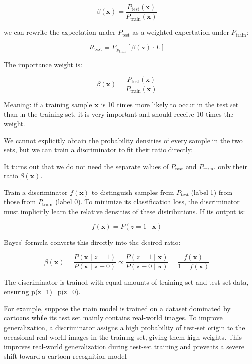 \[
\beta(\mathbf{x})=\frac{P_{\mathrm{test}}(\mathbf{x})}{P_{\mathrm{train}}(\mathbf{x})}
\]

we can rewrite the expectation under \(P_{\mathrm{test}}\) as a weighted expectation under \(P_{\mathrm{train}}\):

\[
R_{\mathrm{test}}=E_{p_{\mathrm{train}}}[\beta(\mathbf{x})\cdot L]
\]

The importance weight is:

\[
\beta(\mathbf{x})=\frac{P_{\mathrm{test}}(\mathbf{x})}{P_{\mathrm{train}}(\mathbf{x})}
\]

Meaning: if a training sample \(\mathbf{x}\) is 10 times more likely to occur in the test set than in the training set, it is very important and should receive 10 times the weight.

We cannot explicitly obtain the probability densities of every sample in the two sets, but we can train a discriminator to fit their ratio directly:

It turns out that we do not need the separate values of \(P_{\mathrm{test}}\) and \(P_{\mathrm{train}}\), only their ratio \(\beta(\mathbf{x})\).

Train a discriminator \(f(\mathbf{x})\) to distinguish samples from \(P_{\mathrm{test}}\) (label 1) from those from \(P_{\mathrm{train}}\) (label 0). To minimize its classification loss, the discriminator must implicitly learn the relative densities of these distributions. If its output is:

\[
f(\mathbf{x})=P(z=1\mid\mathbf{x})
\]

Bayes' formula converts this directly into the desired ratio:

\[
\beta(\mathbf{x})
=\frac{P(\mathbf{x}\mid z=1)}{P(\mathbf{x}\mid z=0)}
\propto\frac{P(z=1\mid\mathbf{x})}{P(z=0\mid\mathbf{x})}
=\frac{f(\mathbf{x})}{1-f(\mathbf{x})}
\]

The discriminator is trained with equal amounts of training-set and test-set data, ensuring p(z=1)=p(z=0).

For example, suppose the main model is trained on a dataset dominated by cartoons while its test set mainly contains real-world images. To improve generalization, a discriminator assigns a high probability of test-set origin to the occasional real-world images in the training set, giving them high weights. This improves real-world generalization during test-set training and prevents a severe shift toward a cartoon-recognition model.

